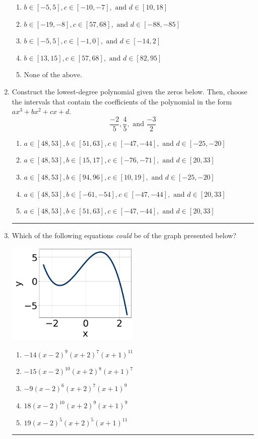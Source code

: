 \documentclass[14pt]{extbook}
\newcommand{\litem}[1]{\item#1\hspace*{-1cm}\rule{\textwidth}{0.4pt}}
\begin{document}
\begin{enumerate}
{\begin{enumerate}[label=\Alph*.]
\item \( b \in [-5, 5], c \in [-10, -7], \text{ and } d \in [10, 18] \)
\item \( b \in [-19, -8], c \in [57, 68], \text{ and } d \in [-88, -85] \)
\item \( b \in [-5, 5], c \in [-1, 0], \text{ and } d \in [-14, 2] \)
\item \( b \in [13, 15], c \in [57, 68], \text{ and } d \in [82, 95] \)
\item \( \text{None of the above.} \)

\end{enumerate} }
\litem{
Construct the lowest-degree polynomial given the zeros below. Then, choose the intervals that contain the coefficients of the polynomial in the form $ax^3+bx^2+cx+d$.\[ \frac{-2}{5}, \frac{4}{5}, \text{ and } \frac{-3}{2} \]\begin{enumerate}[label=\Alph*.]
\item \( a \in [48, 53], b \in [51, 63], c \in [-47, -44], \text{ and } d \in [-25, -20] \)
\item \( a \in [48, 53], b \in [15, 17], c \in [-76, -71], \text{ and } d \in [20, 33] \)
\item \( a \in [48, 53], b \in [94, 96], c \in [10, 19], \text{ and } d \in [-25, -20] \)
\item \( a \in [48, 53], b \in [-61, -54], c \in [-47, -44], \text{ and } d \in [20, 33] \)
\item \( a \in [48, 53], b \in [51, 63], c \in [-47, -44], \text{ and } d \in [20, 33] \)

\end{enumerate} }
\litem{
Which of the following equations \textit{could} be of the graph presented below?
\begin{center}
    \includegraphics[width=0.5\textwidth]{../Figures/polyGraphToFunctionA.png}
\end{center}
\begin{enumerate}[label=\Alph*.]
\item \( -14(x - 2)^{9} (x + 2)^{7} (x + 1)^{11} \)
\item \( -15(x - 2)^{10} (x + 2)^{8} (x + 1)^{7} \)
\item \( -9(x - 2)^{6} (x + 2)^{7} (x + 1)^{9} \)
\item \( 18(x - 2)^{10} (x + 2)^{9} (x + 1)^{9} \)
\item \( 19(x - 2)^{5} (x + 2)^{5} (x + 1)^{11} \)

\end{enumerate} }
\end{enumerate}
\end{document}
